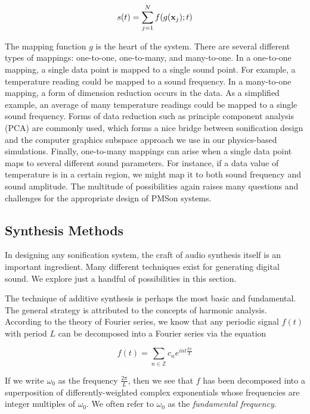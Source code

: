 \begin{equation}
s(t) = \sum_{j=1}^N f(g(\mathbf{x}_j); t)
\end{equation}

The mapping function $g$ is the heart of the system. There are several 
different types of mappings: one-to-one, one-to-many, and many-to-one. In a 
one-to-one mapping, a single data point is mapped to a single sound point. 
For example, a temperature reading could be mapped to a sound frequency. In a 
many-to-one mapping, a form of dimension reduction occurs in the data. As a 
simplified example, an average of many temperature readings could be mapped 
to a single sound frequency. Forms of data reduction such as principle 
component analysis (PCA) are commonly used, which forms a nice bridge between 
sonification design and the computer graphics subspace approach we use in our 
physics-based simulations. Finally, one-to-many mappings can arise when a 
single data point maps to several different sound parameters. For instance, 
if a data value of temperature is in a certain region, we might map it to 
both sound frequency and sound amplitude. The multitude of possibilities 
again raises many questions and challenges for the appropriate design of 
PMSon systems.

\subsection{Synthesis Methods}
In designing any sonification system, the craft of audio synthesis itself is 
an important ingredient. Many different techniques exist for generating 
digital sound. We explore just a handful of possibilities in this section.

The technique of additive synthesis is perhaps the most basic and 
fundamental. The general strategy is attributed to the concepts of harmonic 
analysis. According to the theory of Fourier series, we know that any 
periodic signal $f(t)$ with period $L$ can be decomposed into a Fourier 
series via the equation

\begin{equation}
f(t) = \sum_{n \in \mathbb{Z}} c_n e^{int \frac{2\pi}{L}}
\end{equation}

If we write $\omega_0$ as the frequency $\frac{2\pi}{L}$, then we see that $f$
 has been decomposed into a superposition of differently-weighted complex 
exponentials whose frequencies are integer multiples of $\omega_0$. We often 
refer to $\omega_0$ as the {\em fundamental frequency}. 

